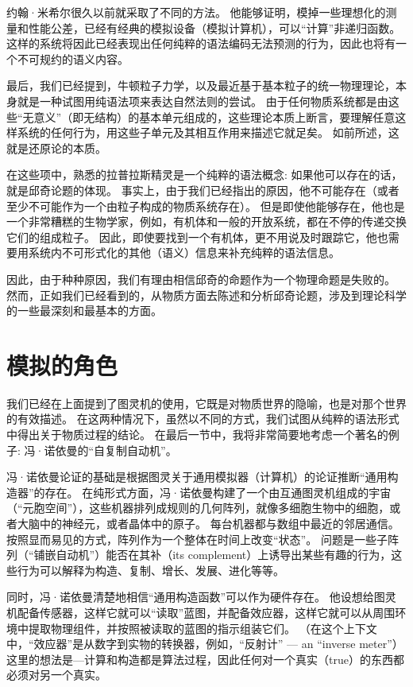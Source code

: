 \documentclass[a4paper,12pt]{article}
\begin{document}
约翰·米希尔很久以前就采取了不同的方法\cite{MyhillJ1966}。
他能够证明，模掉一些理想化的测量和性能公差，已经有经典的模拟设备（模拟计算机），可以“计算”非递归函数。
这样的系统将因此已经表现出任何纯粹的语法编码无法预测的行为，因此也将有一个不可规约的语义内容。

最后，我们已经提到，牛顿粒子力学，以及最近基于基本粒子的统一物理理论，本身就是一种试图用纯语法项来表达自然法则的尝试。
由于任何物质系统都是由这些“无意义”（即无结构）的基本单元组成的，这些理论本质上断言，要理解任意这样系统的任何行为，用这些子单元及其相互作用来描述它就足矣。
如前所述，这就是还原论的本质。

在这些项中，熟悉的拉普拉斯精灵是一个纯粹的语法概念: 如果他可以存在的话，就是邱奇论题的体现。
事实上，由于我们已经指出的原因，他不可能存在（或者至少不可能作为一个由粒子构成的物质系统存在）。
但是即使他能够存在，他也是一个非常糟糕的生物学家，例如，有机体和一般的开放系统，都在不停的传递交换它们的组成粒子。
因此，即使要找到一个有机体，更不用说及时跟踪它，他也需要用系统内不可形式化的其他（语义）信息来补充纯粹的语法信息。

因此，由于种种原因，我们有理由相信邱奇的命题作为一个物理命题是失败的。
然而，正如我们已经看到的，从物质方面去陈述和分析邱奇论题，涉及到理论科学的一些最深刻和最基本的方面。

\section{模拟的角色}

我们已经在上面提到了图灵机的使用，它既是对物质世界的隐喻，也是对那个世界的有效描述。
在这两种情况下，虽然以不同的方式，我们试图从纯粹的语法形式中得出关于物质过程的结论。
在最后一节中，我将非常简要地考虑一个著名的例子: 冯·诺依曼的“自复制自动机”\cite{BurksA1966}\cite{ArbibMA1988}。

冯·诺依曼论证的基础是根据图灵关于通用模拟器（计算机）的论证推断“通用构造器”的存在。
在纯形式方面，冯·诺依曼构建了一个由互通图灵机组成的宇宙（“元胞空间”），这些机器排列成规则的几何阵列，就像多细胞生物中的细胞，或者大脑中的神经元，或者晶体中的原子。
每台机器都与数组中最近的邻居通信。按照显而易见的方式，阵列作为一个整体在时间上改变“状态”。
问题是一些子阵列（“铺嵌自动机”）能否在其补（its complement）上诱导出某些有趣的行为，这些行为可以解释为构造、复制、增长、发展、进化等等。

同时，冯·诺依曼清楚地相信“通用构造函数”可以作为硬件存在。
他设想给图灵机配备传感器，这样它就可以“读取”蓝图，并配备效应器，这样它就可以从周围环境中提取物理组件，并按照被读取的蓝图的指示组装它们。
（在这个上下文中，“效应器”是从数字到实物的转换器，例如，“反射计” — an “inverse meter”）
这里的想法是—计算和构造都是算法过程，因此任何对一个真实（true）的东西都必须对另一个真实。
\end{document}
